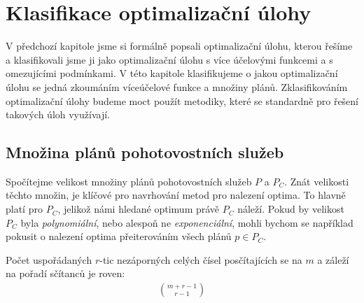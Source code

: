 \section{Klasifikace optimalizační úlohy}

V předchozí kapitole jsme si formálně popsali optimalizační úlohu, kterou řešíme a klasifikovali jsme ji jako optimalizační úlohu s více účelovými funkcemi a s omezujícími podmínkami.
V této kapitole klasifikujeme o jakou optimalizační úlohu se jedná zkoumáním víceúčelové funkce a množiny plánů.
Zklasifikováním optimalizační úlohy budeme moct použít metodiky, které se standardně pro řešení takových úloh využívají. 

\subsection{Množina plánů pohotovostních služeb}

Spočítejme velikost množiny plánů pohotovostních služeb $P$ a $P_C$.
Znát velikosti těchto množin, je klíčové pro navrhování metod pro nalezení optima.
To hlavně platí pro $P_C$, jelikož námi hledané optimum právě $P_C$ náleží.
Pokud by velikost $P_C$ byla \textit{polynomiální}, nebo alespoň ne \textit{exponenciální},
mohli bychom se například pokusit o nalezení optima přeiterováním všech plánů $p \in P_C$.

\begin{lemma}
  Počet uspořádaných $r$-tic nezáporných celých čísel posčítajících se na $m$ a záleží na pořadí sčítanců je roven: 
  \begin{align}
    \binom{m + r - 1}{r - 1}
  \end{align}
  \\
\end{lemma}

